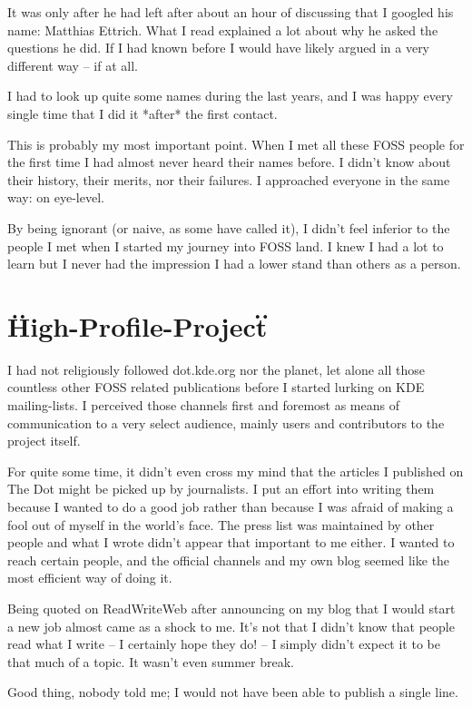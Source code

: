 It was only after he had left after about an hour of discussing that I googled his name: Matthias Ettrich. What I read explained a lot about why he asked the questions he did. If I had known before I would have likely argued in a very different way -- if at all.

I had to look up quite some names during the last years, and I was happy every single time that I did it *after* the first contact.

This is probably my most important point. When I met all these FOSS people for the first time I had almost never heard their names before. I didn't know about their history, their merits, nor their failures. I approached everyone in the same way: on eye-level. 

By being ignorant (or naive, as some have called it), I didn't feel inferior to the people I met when I started my journey into FOSS land. I knew I had a lot to learn but I never had the impression I had a lower stand than others as a person.

\section{\"High-Profile-Project\"}

I had not religiously followed dot.kde.org nor the planet, let alone all those countless other FOSS related publications before I started lurking on KDE mailing-lists. I perceived those channels first and foremost as means of communication to a very select audience, mainly users and  contributors to the project itself. 

For quite some time, it didn't even cross my mind that the articles I published on The Dot might be picked up by journalists. I put an effort into writing them because I wanted to do a good job rather than because I was afraid of making a fool out of myself in the world's face. The press list was maintained by other people and what I wrote didn't appear that important to me either. I wanted to reach certain people, and the official channels and my own blog seemed like the most efficient way of doing it.

Being quoted on ReadWriteWeb after announcing on my blog that I would start a new job almost came as a shock to me. It's not that I didn't know that people read what I write -- I certainly hope they do! -- I simply didn't expect it to be that much of a topic. It wasn't even summer break.

Good thing, nobody told me; I would not have been able to publish a single line.

